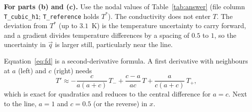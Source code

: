 \textbf{For parts (b) and (c).} Use the nodal values of Table~\ref{tab:answer} (file column \texttt{T\_cubic\_h1}; \texttt{T\_reference}
holds $T^*$). The conductivity does not enter $T$. The deviation from $T^*$ (up to $3.1$~K) is the temperature uncertainty to
carry forward, and a gradient divides temperature differences by a spacing of $0.5$ to $1$, so the uncertainty in $\vec q$ is
larger still, particularly near the line.

Equation~\eqref{eq:fd} is a second-derivative formula. A first derivative with neighbours at $a$ (left) and $c$ (right) needs
\begin{equation}
  T'\approx -\frac{c}{a(a+c)}\,T_- + \frac{c-a}{ac}\,T + \frac{a}{c(a+c)}\,T_+ ,
\end{equation}
which is exact for quadratics and reduces to the central difference for $a=c$. Next to the line, $a=1$ and $c=0.5$ (or the
reverse) in $x$.
